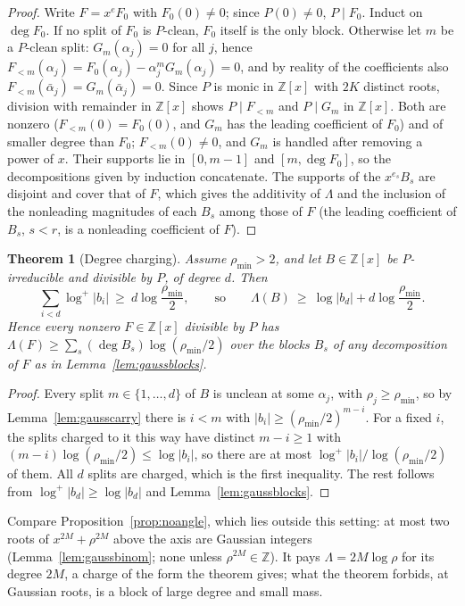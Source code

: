 \documentclass[11pt]{article}
\newtheorem{theorem}{Theorem}[section]
\begin{document}
\begin{proof}
Write $F=x^eF_0$ with $F_0(0)\ne0$; since $P(0)\ne0$, $P\mid F_0$.  Induct
on $\deg F_0$.  If no split of $F_0$ is $P$-clean, $F_0$ itself is the only
block.  Otherwise let $m$ be a $P$-clean split: $G_m(\alpha_j)=0$ for all
$j$, hence $F_{<m}(\alpha_j)=F_0(\alpha_j)-\alpha_j^mG_m(\alpha_j)=0$, and by
reality of the coefficients also $F_{<m}(\bar\alpha_j)=G_m(\bar\alpha_j)=0$.
Since $P$ is monic in $\mathbb Z[x]$ with $2K$ distinct roots, division with
remainder in $\mathbb Z[x]$ shows $P\mid F_{<m}$ and $P\mid G_m$ in
$\mathbb Z[x]$.  Both are nonzero ($F_{<m}(0)=F_0(0)$, and $G_m$ has the leading
coefficient of $F_0$) and of smaller degree than $F_0$; $F_{<m}(0)\ne0$, and
$G_m$ is handled after removing a power of $x$.  Their supports lie in
$[0,m-1]$ and $[m,\deg F_0]$, so the decompositions given by induction
concatenate.  The supports of the $x^{e_s}B_s$ are disjoint and cover that of
$F$, which gives the additivity of $\Lambda$ and the inclusion of the
nonleading magnitudes of each $B_s$ among those of $F$ (the leading
coefficient of $B_s$, $s<r$, is a nonleading coefficient of $F$).
\end{proof}

\begin{theorem}[Degree charging]\label{thm:gausscharge}
Assume $\rho_{\min}>2$, and let $B\in\mathbb Z[x]$ be $P$-irreducible and
divisible by $P$, of degree $d$.  Then
\[
  \sum_{i<d}\log^+|b_i|\ \ge\ d\log\frac{\rho_{\min}}2,
  \qquad\text{so}\qquad
  \Lambda(B)\ \ge\ \log|b_d|+d\log\frac{\rho_{\min}}2 .
\]
Hence every nonzero $F\in\mathbb Z[x]$ divisible by $P$ has
$\Lambda(F)\ge\sum_s(\deg B_s)\log(\rho_{\min}/2)$ over the blocks $B_s$ of
any decomposition of $F$ as in Lemma~\ref{lem:gaussblocks}.
\end{theorem}

\begin{proof}
Every split $m\in\{1,\ldots,d\}$ of $B$ is unclean at some $\alpha_j$, with
$\rho_j\ge\rho_{\min}$, so by Lemma~\ref{lem:gausscarry} there is $i<m$ with
$|b_i|\ge(\rho_{\min}/2)^{m-i}$.  For a fixed $i$, the splits charged to it
this way have distinct $m-i\ge1$ with
$(m-i)\log(\rho_{\min}/2)\le\log|b_i|$, so there are at most
$\log^+|b_i|/\log(\rho_{\min}/2)$ of them.  All $d$ splits are charged, which
is the first inequality.  The rest follows from $\log^+|b_d|\ge\log|b_d|$ and
Lemma~\ref{lem:gaussblocks}.
\end{proof}

Compare Proposition~\ref{prop:noangle}, which lies outside this setting: at
most two roots of $x^{2M}+\rho^{2M}$ above the axis are Gaussian integers
(Lemma~\ref{lem:gaussbinom}; none unless $\rho^{2M}\in\mathbb Z$).  It
pays $\Lambda=2M\log\rho$ for its degree $2M$, a charge of the form the
theorem gives; what the theorem forbids, at Gaussian roots, is a block of
large degree and small mass.
\end{document}
